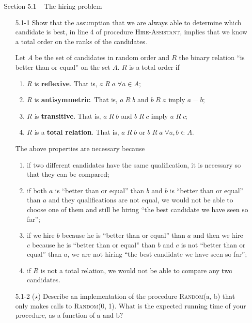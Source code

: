 \documentclass{report}
\makeatletter
\renewenvironment{framed}{%
 \def\FrameCommand##1{\hskip\@totalleftmargin
 \fboxsep=\FrameSep\fbox{##1}}%
 \MakeFramed {\advance\hsize-\width
   \@totalleftmargin\z@ \linewidth\hsize
   \@setminipage}}%
 {\par\unskip\endMakeFramed}
\DeclareMathOperator{\Forall}{\forall}
\makeatother
\begin{document}
\small

{\large Section 5.1 {--} The hiring problem}

\begin{enumerate}

\item[5.1{-}1]{Show that the assumption that we are always able to determine
which candidate is best, in line 4 of procedure \textsc{Hire-Assistant}, implies
that we know a total order on the ranks of the candidates.}

\begin{framed}
Let $A$ be the set of candidates in random order and $R$ the binary relation
``is better than or equal'' on the set $A$. $R$ is a total order if
\begin{enumerate}
  \item $R$ is \textbf{reflexive}. That is, $a\;R\;a \; \Forall a \in A$;
  \item $R$ is \textbf{antisymmetric}. That is, $a\;R\;b$ and $b\;R\;a$ imply $a = b$;
  \item $R$ is \textbf{transitive}. That is, $a\;R\;b$ and $b\;R\;c$ imply $a\;R\;c$;
  \item $R$ is a \textbf{total relation}. That is, $a\;R\;b$ or $b\;R\;a \; \Forall a, b \in A$.
\end{enumerate}

The above properties are necessary because
  \begin{enumerate}
    \item if two different candidates have the same qualification, it is
      necessary so that they can be compared;
    \item if both $a$ is ``better than or equal'' than $b$ and $b$ is ``better
      than or equal'' than $a$ and they qualifications are not equal, we would
      not be able to choose one of them and still be hiring ``the best candidate
      we have seen so far'';
    \item if we hire $b$ because he is ``better than or equal'' than $a$ and
      then we hire $c$ because he is ``better than or equal'' than $b$ and $c$
      is not ``better than or equal'' than $a$, we are not hiring ``the best
      candidate we have seen so far'';
    \item if $R$ is not a total relation, we would not be able to compare any
      two candidates.
\end{enumerate}
\end{framed}

\item[5.1{-}2]{($\star$) Describe an implementation of the procedure \textsc{Random}(a, b)
that only makes calls to \textsc{Random}(0, 1). What is the expected running
time of your procedure, as a function of a and b?}


\end{enumerate}
\end{document}
